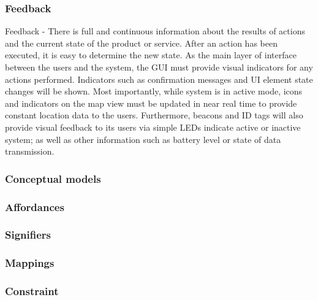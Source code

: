 \subsubsection{Feedback}
\medskip
Feedback - There is full and continuous information about the results of actions and the current state of the product or service. After an action has been executed, it is easy to determine the new state. As the main layer of interface between the users and the system, the GUI must provide visual indicators for any actions performed. Indicators such as confirmation messages and UI element state changes will be shown. Most importantly, while system is in active mode, icons and indicators on the map view must be updated in near real time to provide constant location data to the users. Furthermore, beacons and ID tags will also provide visual feedback to its users via simple LEDs indicate active or inactive system; as well as other information such as battery level or state of data transmission. 
\pagebreak


\subsubsection{Conceptual models}
\medskip



\subsubsection{Affordances}
\medskip



\subsubsection{Signifiers}
\medskip



\subsubsection{Mappings}
\medskip


\subsubsection{Constraint}
\medskip




